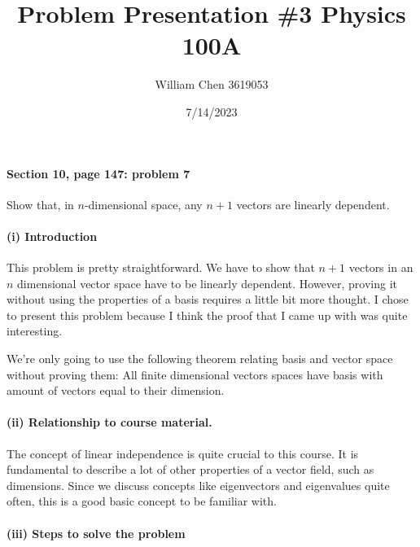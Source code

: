 \documentclass{article}
\title{Problem Presentation \#3 Physics 100A}
\date{7/14/2023}
\author{William Chen 3619053}
\begin{document}
\maketitle

\paragraph{Section 10, page 147: problem 7}
Show that, in $n$-dimensional space, any $n + 1$ vectors are linearly dependent.


\paragraph{(i) Introduction} 

This problem is pretty straightforward. We have to show that $n+1$ vectors in an $n$ dimensional vector space have to be linearly dependent. However, proving it without using the properties of a basis requires a little bit more thought. I chose to present this problem because I think the proof that I came up with was quite interesting.

We're only going to use the following theorem relating basis and vector space without proving them: All finite dimensional vectors spaces have basis with amount of vectors equal to their dimension.

\paragraph{(ii) Relationship to course material.}

The concept of linear independence is quite crucial to this course. It is fundamental to describe a lot of other properties of a vector field, such as dimensions. Since we discuss concepts like eigenvectors and eigenvalues quite often, this is a good basic concept to be familiar with.

\paragraph{(iii) Steps to solve the problem}
\end{document}
